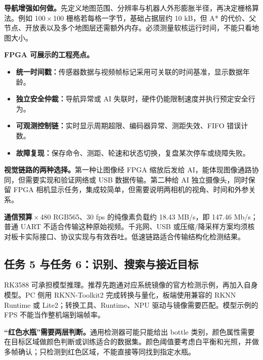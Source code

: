 \documentclass[UTF8,a4paper,zihao=-4,fontset=fandol]{ctexart}
\newcommand{\warn}[2]{\par\smallskip\noindent\colorbox{Warm}{\parbox{\dimexpr\linewidth-2\fboxsep\relax}{\small\textbf{\color{Amber}#1}\quad #2}}\par\smallskip}
\newcommand{\nextpage}{\clearpage}
\begin{document}
\textbf{导航增强如何做。}先定义地图范围、分辨率与机器人外形膨胀半径，再决定栅格算法。例如 100\,$\times$\,100 栅格若每格一字节，基础占据层约 10 kB，但 A* 的代价、父节点、开放表以及多个地图层还需额外内存。必须测量软核运行时间，不能只看地图大小。

\textbf{FPGA 可展示的工程亮点。}
\begin{itemize}
\item \textbf{统一时间戳：}传感器数据与视频帧标记采用可关联的时间基准，显示数据年龄。
\item \textbf{独立安全仲裁：}导航异常或 AI 失联时，硬件仍能限制速度并执行预定安全行为。
\item \textbf{可观测控制链：}实时显示周期超限、编码器异常、测距失效、FIFO 错误计数。
\item \textbf{故障复现：}保存命令、测距、轮速和状态切换，复盘某次停车或绕障失败。
\end{itemize}

\textbf{视觉链路的两种选择。}第一种让图像经 FPGA 缩放后发给 AI，能体现图像通路协同，但需要实现和验证网络或 USB 数据传输。第二种给 AI 独立摄像头，同时保留 FPGA 相机显示任务，集成较简单，但需要说明两相机的视角、时间和外参关系。

\warn{通信预算}{640\,$\times$\,480 RGB565、30 fps 的纯像素负载约 18.43 MB/s，即 147.46 Mb/s；普通 UART 不适合传输这种原始视频。千兆网、USB 或压缩/降采样方案均须核对板卡实际接口、协议实现与有效吞吐。低速链路适合传输结构化检测结果。}

\nextpage
\subsection{任务 5 与任务 6：识别、搜索与接近目标}

RK3588 可承担模型推理。推荐先跑通对应系统镜像的官方检测示例，再加入自身模型。PC 侧用 RKNN-Toolkit2 完成转换与量化，板端使用兼容的 RKNN Runtime 或 Lite2；转换工具、Runtime、NPU 驱动与镜像需要匹配。模型示例的 FPS 不能当作整机端到端帧率。\cite{rknn}

\textbf{“红色水瓶”需要两层判断。}通用检测器可能只能给出 bottle 类别，颜色属性需要在目标区域做颜色判断或训练适合的数据集。颜色阈值要考虑白平衡和光照，并做多帧确认；只检测到红色区域，不能直接等同找到指定水瓶。
\end{document}
